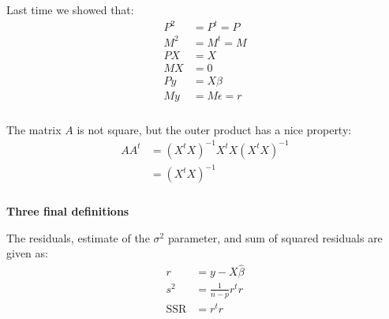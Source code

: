 \begin{frame}[fragile] \frametitle{}

Last time we showed that:
\begin{align*}
P^2 &= P^t = P \\
M^2 &= M^t = M \\
PX &= X \\
MX &= 0 \\
Py &= X\beta \\
My &= M\epsilon = r
\end{align*}

\end{frame}

\begin{frame}[fragile] \frametitle{}

The matrix $A$ is not square, but the outer product
has a nice property:
\begin{align*}
AA^t &= (X^t X)^{-1} X^t X (X^t X)^{-1} \\
&= (X^t X)^{-1}
\end{align*}

\end{frame}

\begin{frame}[fragile] \frametitle{}

{\bf Three final definitions}

The residuals, estimate of the $\sigma^2$ parameter,
and sum of squared residuals are given as:
\begin{align*}
r &= y - X\widehat{\beta} \\
s^2 &= \frac{1}{n-p} r^t r \\
\text{SSR} &= r^t r
\end{align*}

\end{frame}

